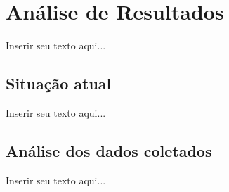 %
%

\chapter{Análise de Resultados}

Inserir seu texto aqui...

\section{Situação atual}

Inserir seu texto aqui...

\section{Análise dos dados coletados}

Inserir seu texto aqui...

